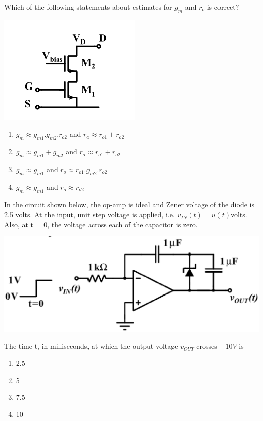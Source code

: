 Which of the following statements about estimates for $g_m$ and $r_o$ is correct?

\includegraphics[scale=0.65]{11}

\begin{enumerate}
\item $g_m \approx g_{m1}.g_{m2}.r_{o2}$ and $r_o \approx r_{o1} + r_{o2}$
\item $g_m \approx g_{m1} + g_{m2}$ and $r_o \approx r_{o1} + r_{o2}$
\item $g_m \approx g_{m1}$ and $r_o \approx r_{o1}.g_{m2}.r_{o2}$
\item $g_m \approx g_{m1}$ and $r_o \approx r_{o2}$
\end{enumerate} 

\item In the circuit shown below, the op-amp is ideal and Zener voltage of the diode is 2.5 volts. At the input, unit step voltage is applied, i.e. $v_{IN}(t) = u(t)$volts. Also, at t = 0, the voltage across each of the capacitor is zero.

\includegraphics[scale=0.35]{12}

The time t, in milliseconds, at which the output voltage $v_{OUT}$ crosses $-10V$ is
\begin{enumerate}
\item 2.5
\item 5
\item 7.5
\item 10
\end{enumerate}

